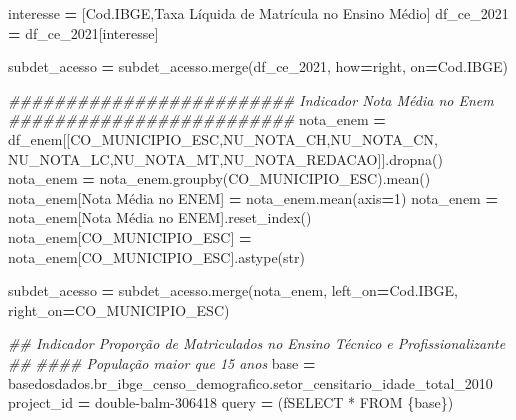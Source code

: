 \documentclass[
  12,
  dvipsnames]{article}
\newenvironment{Shaded}{\begin{snugshade}}{\end{snugshade}}
\newcommand{\BuiltInTok}[1]{#1}
\newcommand{\CommentTok}[1]{\textcolor[rgb]{0.56,0.35,0.01}{\textit{#1}}}
\newcommand{\DecValTok}[1]{\textcolor[rgb]{0.00,0.00,0.81}{#1}}
\newcommand{\NormalTok}[1]{#1}
\newcommand{\OperatorTok}[1]{\textcolor[rgb]{0.81,0.36,0.00}{\textbf{#1}}}
\newcommand{\SpecialCharTok}[1]{\textcolor[rgb]{0.00,0.00,0.00}{#1}}
\newcommand{\SpecialStringTok}[1]{\textcolor[rgb]{0.31,0.60,0.02}{#1}}
\newcommand{\StringTok}[1]{\textcolor[rgb]{0.31,0.60,0.02}{#1}}
\begin{document}
\begin{Shaded}
\begin{Highlighting}[]
\NormalTok{interesse }\OperatorTok{=}\NormalTok{ [}\StringTok{\textquotesingle{}Cod.IBGE\textquotesingle{}}\NormalTok{,}\StringTok{\textquotesingle{}Taxa Líquida de Matrícula no Ensino Médio\textquotesingle{}}\NormalTok{]}
\NormalTok{df\_ce\_2021 }\OperatorTok{=}\NormalTok{ df\_ce\_2021[interesse]}

\NormalTok{subdet\_acesso }\OperatorTok{=}\NormalTok{ subdet\_acesso.merge(df\_ce\_2021, how}\OperatorTok{=}\StringTok{\textquotesingle{}right\textquotesingle{}}\NormalTok{, on}\OperatorTok{=}\StringTok{\textquotesingle{}Cod.IBGE\textquotesingle{}}\NormalTok{)}

\CommentTok{\#\#\#\#\#\#\#\#\#\#\#\#\#\#\#\#\#\#\#\#\#\#\#\#\# Indicador Nota Média no Enem \#\#\#\#\#\#\#\#\#\#\#\#\#\#\#\#\#\#\#\#\#\#\#\#\#}
\NormalTok{nota\_enem }\OperatorTok{=}\NormalTok{ df\_enem[[}\StringTok{\textquotesingle{}CO\_MUNICIPIO\_ESC\textquotesingle{}}\NormalTok{,}\StringTok{\textquotesingle{}NU\_NOTA\_CH\textquotesingle{}}\NormalTok{,}\StringTok{\textquotesingle{}NU\_NOTA\_CN\textquotesingle{}}\NormalTok{,}
                     \StringTok{\textquotesingle{}NU\_NOTA\_LC\textquotesingle{}}\NormalTok{,}\StringTok{\textquotesingle{}NU\_NOTA\_MT\textquotesingle{}}\NormalTok{,}\StringTok{\textquotesingle{}NU\_NOTA\_REDACAO\textquotesingle{}}\NormalTok{]].dropna()}
\NormalTok{nota\_enem }\OperatorTok{=}\NormalTok{ nota\_enem.groupby(}\StringTok{\textquotesingle{}CO\_MUNICIPIO\_ESC\textquotesingle{}}\NormalTok{).mean()}
\NormalTok{nota\_enem[}\StringTok{\textquotesingle{}Nota Média no ENEM\textquotesingle{}}\NormalTok{] }\OperatorTok{=}\NormalTok{ nota\_enem.mean(axis}\OperatorTok{=}\DecValTok{1}\NormalTok{)}
\NormalTok{nota\_enem }\OperatorTok{=}\NormalTok{ nota\_enem[}\StringTok{\textquotesingle{}Nota Média no ENEM\textquotesingle{}}\NormalTok{].reset\_index()}
\NormalTok{nota\_enem[}\StringTok{\textquotesingle{}CO\_MUNICIPIO\_ESC\textquotesingle{}}\NormalTok{] }\OperatorTok{=}\NormalTok{ nota\_enem[}\StringTok{\textquotesingle{}CO\_MUNICIPIO\_ESC\textquotesingle{}}\NormalTok{].astype(}\BuiltInTok{str}\NormalTok{)}

\NormalTok{subdet\_acesso }\OperatorTok{=}\NormalTok{ subdet\_acesso.merge(nota\_enem, left\_on}\OperatorTok{=}\StringTok{\textquotesingle{}Cod.IBGE\textquotesingle{}}\NormalTok{, }
\NormalTok{                                    right\_on}\OperatorTok{=}\StringTok{\textquotesingle{}CO\_MUNICIPIO\_ESC\textquotesingle{}}\NormalTok{)}

\CommentTok{\#\# Indicador Proporção de Matriculados no Ensino Técnico e Profissionalizante \#\#}
\CommentTok{\#\#\#\# População maior que 15 anos }
\NormalTok{base }\OperatorTok{=} \StringTok{\textquotesingle{}\textasciigrave{}basedosdados.br\_ibge\_censo\_demografico.setor\_censitario\_idade\_total\_2010\textasciigrave{}\textquotesingle{}}
\NormalTok{project\_id }\OperatorTok{=} \StringTok{\textquotesingle{}double{-}balm{-}306418\textquotesingle{}}
\NormalTok{query }\OperatorTok{=}\NormalTok{ (}\SpecialStringTok{f\textquotesingle{}SELECT * FROM }\SpecialCharTok{\{}\NormalTok{base}\SpecialCharTok{\}}\SpecialStringTok{\textquotesingle{}}\NormalTok{)}


\end{Highlighting}
\end{Shaded}
\end{document}
